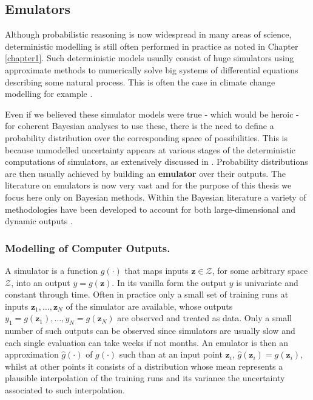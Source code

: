 \subsection{Emulators} 
\label{sec:emu}
Although probabilistic reasoning is now widespread in many areas of science, deterministic modelling is still often performed in practice as noted in Chapter \ref{chapter1}. Such deterministic models usually consist of huge simulators using approximate methods to numerically solve big systems of differential equations describing some natural process. This is often the case in climate change modelling for example \citep{Rougier2015}.

Even if we believed these simulator models were true - which would be heroic - for coherent Bayesian analyses to use these, there is the need to define a probability distribution over the corresponding space of possibilities. This is because unmodelled uncertainty appears at various stages of the deterministic computations of simulators, as extensively discussed in \cite{Kennedy2000}. Probability distributions are then usually achieved by building an \textbf{emulator} over their outputs. The literature on emulators is now very vast \citep{Kennedy2006, Kennedy2001,OHagan2006,Santner2003} and for the purpose of this thesis we focus here only on Bayesian methods. Within the Bayesian literature a variety of methodologies have been developed to account for both large-dimensional and dynamic outputs \citep{Conti2009,Liu2009, Rougier2008,Craig2001, Goldstein2006, Williamson2011}.

\subsubsection{Modelling of Computer Outputs.}
A simulator is a function $g(\cdot)$ that maps inputs $\bm{z}\in\bm{\mathcal{Z}}$, for some arbitrary space $\bm{\mathcal{Z}}$, into an output $y=g(\bm{z})$. In its vanilla form the output $y$ is univariate and constant through time. Often in practice only a small set of training runs at inputs $\bm{z}_1,\dots, \bm{z}_N$ of the simulator are available, whose outputs $y_1=g(\bm{z}_1),\dots, y_N=g(\bm{z}_N)$ are observed and treated as data. Only a small number of such outputs can be observed since simulators are usually slow and each single evaluation can take weeks if not months. An emulator is then an approximation $\hat{g}(\cdot)$ of $g(\cdot)$ such than at an input point $\bm{z}_i$, $\hat{g}(\bm{z}_i)=g(\bm{z}_i)$, whilst at other points it consists of a distribution whose mean represents a plausible interpolation of the training runs and its variance the uncertainty associated to such interpolation.

